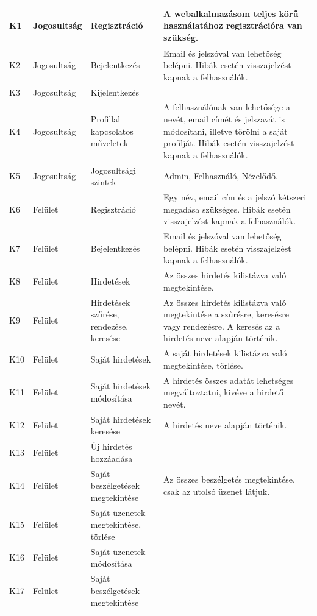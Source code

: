 \documentclass[]{thesis-ekf}
\theoremstyle{definition}
\theoremstyle{remark}
\begin{document}
\begin{longtable}{|l|l|p{3cm}|p{8cm}|}
				K1 & Jogosultság & Regisztráció & A webalkalmazásom teljes körű használatához regisztrációra van szükség. \\ \hline
				K2 & Jogosultság & Bejelentkezés & Email és jelszóval van lehetőség belépni. Hibák esetén visszajelzést kapnak a felhasználók. \\ \hline
				K3 & Jogosultság & Kijelentkezés & \\ \hline
				K4 & Jogosultság & Profillal kapcsolatos műveletek & A felhasználónak van lehetősége a nevét, email címét és jelszavát is módosítani, illetve törölni a saját profilját. Hibák esetén visszajelzést kapnak a felhasználók. \\ \hline
				K5 & Jogosultság & Jogosultsági szintek & Admin, Felhasználó, Nézelődő. \\ \hline
				K6 & Felület & Regisztráció & Egy név, email cím és a jelszó kétszeri megadása szükséges. Hibák esetén visszajelzést kapnak a felhasználók. \\ \hline
				K7 & Felület & Bejelentkezés & Email és jelszóval van lehetőség belépni. Hibák esetén visszajelzést kapnak a felhasználók. \\ \hline
				K8 & Felület & Hirdetések & Az összes hirdetés kilistázva való megtekintése. \\ \hline
				K9 & Felület & Hirdetések szűrése, rendezése, keresése & Az összes hirdetés kilistázva való megtekintése a szűrésre, keresésre vagy rendezésre. A keresés az a hirdetés neve alapján történik. \\ \hline
				K10 & Felület & Saját hirdetések & A saját hirdetések kilistázva való megtekintése, törlése. \\ \hline
				K11 & Felület & Saját hirdetések módosítása & A hirdetés összes adatát lehetséges megváltoztatni, kivéve a hirdető nevét. \\ \hline
				K12 & Felület & Saját hirdetések keresése & A hirdetés neve alapján történik. \\ \hline
				K13 & Felület & Új hirdetés hozzáadása & ~ \\ \hline
				K14 & Felület & Saját beszélgetések megtekintése & Az összes beszélgetés megtekintése, csak az utolsó üzenet látjuk. \\ \hline
				K15 & Felület & Saját üzenetek megtekintése, törlése & ~ \\ \hline
				K16 & Felület & Saját üzenetek módosítása & ~ \\ \hline
				K17 & Felület & Saját beszélgetések megtekintése & ~ \\ \hline

\end{longtable}
\end{document}
